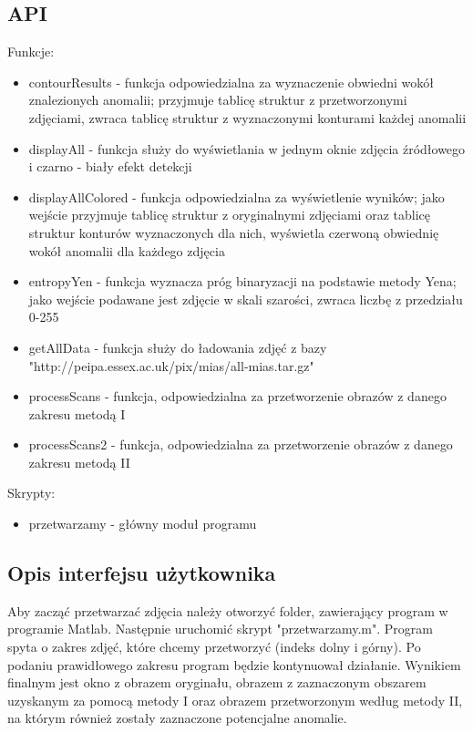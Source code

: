 \documentclass[11pt,openany]{sprawozdanie-agh}
\begin{document}
\subsection{API}
Funkcje:
\begin{itemize}
\item contourResults - funkcja odpowiedzialna za wyznaczenie obwiedni wokół znalezionych anomalii; przyjmuje tablicę struktur z przetworzonymi zdjęciami, zwraca tablicę struktur z wyznaczonymi konturami każdej anomalii
\item displayAll - funkcja służy do wyświetlania w jednym oknie zdjęcia źródłowego i czarno - biały efekt detekcji
\item displayAllColored - funkcja odpowiedzialna za wyświetlenie wyników; jako wejście przyjmuje tablicę struktur z oryginalnymi zdjęciami oraz tablicę struktur konturów wyznaczonych dla nich, wyświetla czerwoną obwiednię wokół anomalii dla każdego zdjęcia
\item entropyYen - funkcja wyznacza próg binaryzacji na podstawie metody Yena; jako wejście podawane jest zdjęcie w skali szarości, zwraca liczbę z przedziału 0-255
\item getAllData - funkcja służy do ładowania zdjęć z bazy "http://peipa.essex.ac.uk/pix/mias/all-mias.tar.gz"
\item processScans - funkcja, odpowiedzialna za przetworzenie obrazów z danego zakresu metodą I
\item processScans2 - funkcja, odpowiedzialna za przetworzenie obrazów z danego zakresu metodą II
\end{itemize}
Skrypty:
\begin{itemize}
\item przetwarzamy - główny moduł programu
\end{itemize}

\subsection{Opis interfejsu użytkownika}
Aby zacząć przetwarzać zdjęcia należy otworzyć folder, zawierający program w programie Matlab. Następnie uruchomić skrypt "przetwarzamy.m". Program spyta o zakres zdjęć, które chcemy przetworzyć (indeks dolny i górny). Po podaniu prawidłowego zakresu program będzie kontynuował działanie. Wynikiem finalnym jest okno z obrazem oryginału, obrazem z zaznaczonym obszarem uzyskanym za pomocą metody I oraz obrazem przetworzonym według metody II, na którym również zostały zaznaczone potencjalne anomalie.



\end{document}
